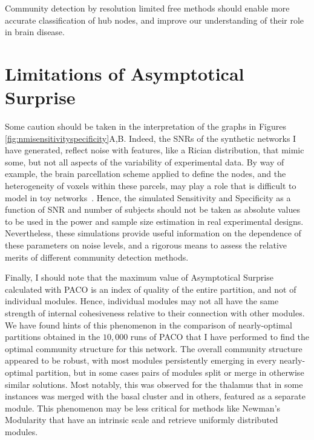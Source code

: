 Community detection by resolution limited free methods should enable more accurate classification of hub nodes, and improve our understanding of their role in brain disease.


\section{Limitations of Asymptotical Surprise}
Some caution should be taken in the interpretation of the graphs in Figures \ref{fig:nmisensitivityspecificity}A,B.
Indeed, the SNRs of the synthetic networks I have generated, reflect noise with features, like a Rician distribution, that mimic some, but not all aspects of the variability of experimental data.
By way of example, the brain parcellation scheme applied to define the nodes, and the heterogeneity of voxels within these parcels, may play a role that is difficult to model in toy networks~\cite{fornito2010}.
Hence, the simulated Sensitivity and Specificity as a function of SNR and number of subjects should not be taken as absolute values to be used in the power and sample size estimation in real experimental designs.
Nevertheless, these simulations provide useful information on the dependence of these parameters on noise levels, and a rigorous means to assess the relative merits of different community detection methods.

Finally, I should note that the maximum value of Asymptotical Surprise calculated with PACO is an index of quality of the entire partition, and not of individual modules.
Hence, individual modules may not all have the same strength of internal cohesiveness relative to their connection with other modules.
We have found hints of this phenomenon in the comparison of nearly-optimal partitions obtained in the $10,000$ runs of PACO that I have performed to find the optimal community structure for this network.
The overall community structure appeared to be robust, with most modules persistently emerging in every nearly-optimal partition, but in some cases pairs of modules split or merge in otherwise similar solutions.
Most notably, this was observed for the thalamus that in some instances was merged with the basal cluster and in others, featured as a separate module.
This phenomenon may be less critical for methods like Newman's Modularity that have an intrinsic scale and retrieve uniformly distributed modules.

